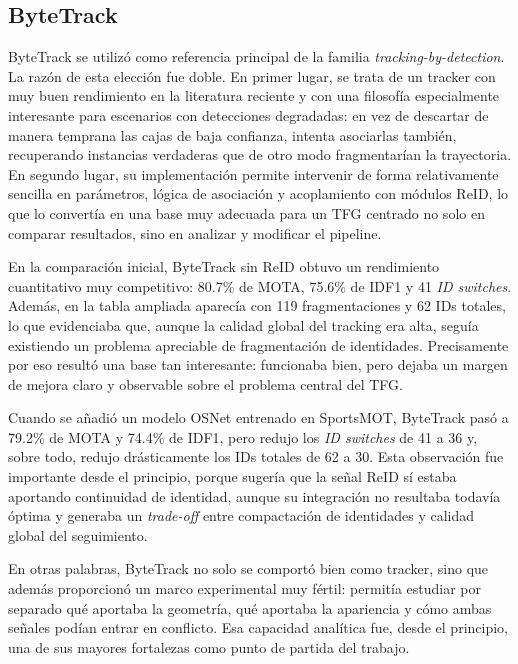 \documentclass[../MAIN.tex]{subfiles}
\begin{document}
	\subsection{ByteTrack}
	
	ByteTrack se utilizó como referencia principal de la familia \textit{tracking-by-detection}. La razón de esta elección fue doble. En primer lugar, se trata de un tracker con muy buen rendimiento en la literatura reciente y con una filosofía especialmente interesante para escenarios con detecciones degradadas: en vez de descartar de manera temprana las cajas de baja confianza, intenta asociarlas también, recuperando instancias verdaderas que de otro modo fragmentarían la trayectoria. En segundo lugar, su implementación permite intervenir de forma relativamente sencilla en parámetros, lógica de asociación y acoplamiento con módulos ReID, lo que lo convertía en una base muy adecuada para un TFG centrado no solo en comparar resultados, sino en analizar y modificar el pipeline.
	
	En la comparación inicial, ByteTrack sin ReID obtuvo un rendimiento cuantitativo muy competitivo: 80.7\% de MOTA, 75.6\% de IDF1 y 41 \textit{ID switches}. Además, en la tabla ampliada aparecía con 119 fragmentaciones y 62 IDs totales, lo que evidenciaba que, aunque la calidad global del tracking era alta, seguía existiendo un problema apreciable de fragmentación de identidades. Precisamente por eso resultó una base tan interesante: funcionaba bien, pero dejaba un margen de mejora claro y observable sobre el problema central del TFG.
	
	Cuando se añadió un modelo OSNet entrenado en SportsMOT, ByteTrack pasó a 79.2\% de MOTA y 74.4\% de IDF1, pero redujo los \textit{ID switches} de 41 a 36 y, sobre todo, redujo drásticamente los IDs totales de 62 a 30. Esta observación fue importante desde el principio, porque sugería que la señal ReID sí estaba aportando continuidad de identidad, aunque su integración no resultaba todavía óptima y generaba un \textit{trade-off} entre compactación de identidades y calidad global del seguimiento.
	
	En otras palabras, ByteTrack no solo se comportó bien como tracker, sino que además proporcionó un marco experimental muy fértil: permitía estudiar por separado qué aportaba la geometría, qué aportaba la apariencia y cómo ambas señales podían entrar en conflicto. Esa capacidad analítica fue, desde el principio, una de sus mayores fortalezas como punto de partida del trabajo.
	
\end{document}
